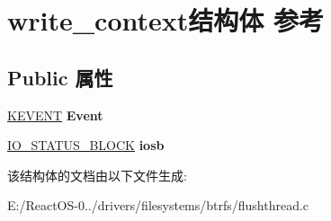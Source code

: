 \hypertarget{structwrite__context}{}\section{write\+\_\+context结构体 参考}
\label{structwrite__context}
\subsection*{Public 属性}
\begin{DoxyCompactItemize}
\item 
\mbox{\label{structwrite__context_a4bc51ea396ec57f676b291e756e48ae4}} 
\hyperlink{struct___k_e_v_e_n_t}{K\+E\+V\+E\+NT} {\bfseries Event}
\item 
\mbox{\label{structwrite__context_a0c3aa6584b08d380c48f33edc697763a}} 
\hyperlink{struct___i_o___s_t_a_t_u_s___b_l_o_c_k}{I\+O\+\_\+\+S\+T\+A\+T\+U\+S\+\_\+\+B\+L\+O\+CK} {\bfseries iosb}
\end{DoxyCompactItemize}


该结构体的文档由以下文件生成\+:\begin{DoxyCompactItemize}
\item 
E\+:/\+React\+O\+S-\/0../drivers/filesystems/btrfs/flushthread.\+c\end{DoxyCompactItemize}

